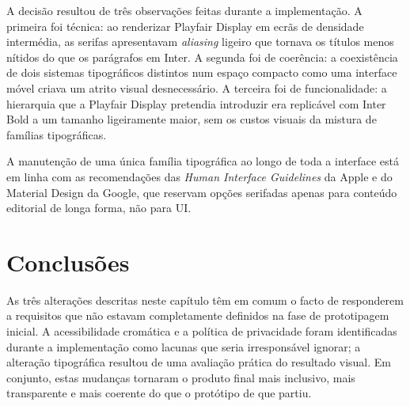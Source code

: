 A decisão resultou de três observações feitas durante a implementação. A primeira foi técnica: ao renderizar Playfair Display em ecrãs de densidade intermédia, as serifas apresentavam \textit{aliasing} ligeiro que tornava os títulos menos nítidos do que os parágrafos em Inter. A segunda foi de coerência: a coexistência de dois sistemas tipográficos distintos num espaço compacto como uma interface móvel criava um atrito visual desnecessário. A terceira foi de funcionalidade: a hierarquia que a Playfair Display pretendia introduzir era replicável com Inter Bold a um tamanho ligeiramente maior, sem os custos visuais da mistura de famílias tipográficas.

A manutenção de uma única família tipográfica ao longo de toda a interface está em linha com as recomendações das \textit{Human Interface Guidelines} da Apple e do Material Design da Google, que reservam opções serifadas apenas para conteúdo editorial de longa forma, não para \ac{UI}.

\section{Conclusões}
\label{chap6:sec:concs}

As três alterações descritas neste capítulo têm em comum o facto de responderem a requisitos que não estavam completamente definidos na fase de prototipagem inicial. A acessibilidade cromática e a política de privacidade foram identificadas durante a implementação como lacunas que seria irresponsável ignorar; a alteração tipográfica resultou de uma avaliação prática do resultado visual. Em conjunto, estas mudanças tornaram o produto final mais inclusivo, mais transparente e mais coerente do que o protótipo de que partiu.
